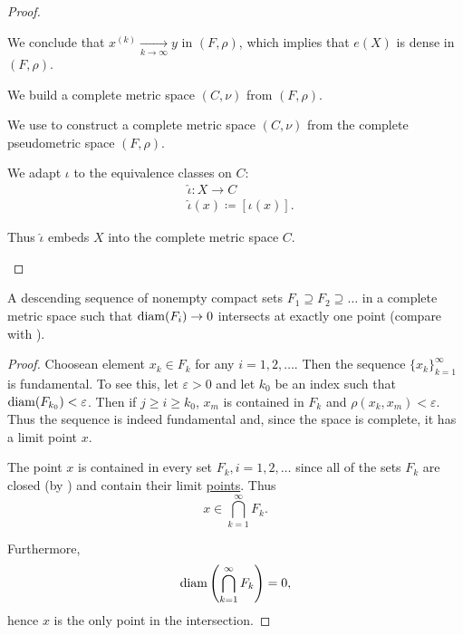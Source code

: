 \begin{proof}
\begin{ThmEnum}
    We conclude that \( x^{(k)} \xrightarrow[k \to \infty]{} y \) in \( (F, \rho) \), which implies that \( e(X) \) is dense in \( (F, \rho) \).

     We build a complete metric space \( (C, \nu) \) from \( (F, \rho) \).

    We use  to construct a complete metric space \( (C, \nu) \) from the complete pseudometric space \( (F, \rho) \).

    We adapt \( \iota \) to the equivalence classes on \( C \):
    \begin{align*}
       & \hat\iota: X \to C                 \\
       & \hat\iota(x) \coloneqq [\iota(x)].
    \end{align*}

    Thus \( \hat\iota \) embeds \( X \) into the complete metric space \( C \).
  \end{ThmEnum}
\end{proof}

\begin{theorem}\label{thm:cantors_nested_compact_theorem}
  A descending sequence of nonempty compact sets \( F_1 \supseteq F_2 \supseteq \ldots \) in a complete metric space such that \( \operatorname{diam}(F_i) \to 0 \) intersects at exactly one point (compare with ).
\end{theorem}
\begin{proof}
  Choose\AOC an element \( x_k \in F_k \) for any \( i = 1, 2, \ldots \). Then the sequence \( \{ x_k \}_{k=1}^\infty \) is fundamental. To see this, let \( \varepsilon > 0 \) and let \( k_0 \) be an index such that \( \operatorname{diam}(F_{k_0}) < \varepsilon \). Then if \( j \geq i \geq k_0 \), \( x_m \) is contained in \( F_k \) and \( \rho(x_k, x_m) < \varepsilon \). Thus the sequence is indeed fundamental and, since the space is complete, it has a limit point \( x \).

  The point \( x \) is contained in every set \( F_k, i = 1, 2, \ldots \) since all of the sets \( F_k \) are closed (by ) and contain their limit \hyperref[thm:limit_point_iff_in_closure]{points}. Thus
  \begin{equation*}
    x \in \bigcap_{k=1}^\infty F_k.
  \end{equation*}

  Furthermore,
  \begin{equation*}
    \operatorname{diam}\left( \bigcap_{k=1}^\infty F_k \right) = 0,
  \end{equation*}
  hence \( x \) is the only point in the intersection.
\end{proof}
